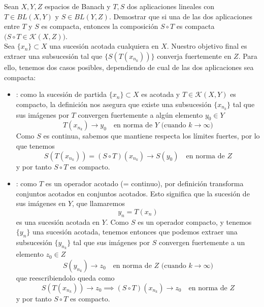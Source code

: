 \begin{ejercicio}
    Sean $X, Y, Z$ espacios de Banach y $T, S$ dos aplicaciones lineales con $T \in BL(X,Y)$ y $S \in BL(Y,Z)$. Demostrar que si una de las dos aplicaciones entre $T$ y $S$ es compacta, entonces la composición $S \circ T$ es compacta $\big( S \circ T \in \mathcal{K}(X,Z) \big)$. \\

    \noindent
    Sea $\{x_n\} \subset X$ una sucesión acotada cualquiera en $X$. Nuestro objetivo final es extraer una subsucesión tal que $\{S(T(x_{n_{k}}))\}$ converja fuertemente en $Z$. Para ello, tenemos dos casos posibles, dependiendo de cual de las dos aplicaciones sea compacta:
    \begin{itemize}
        \item {}: como la sucesión de partida $\{x_n\} \subset X$ es acotada y $T \in \mathcal{K}(X,Y)$ es compacto, la definición nos asegura que existe una subsucesión $\{x_{n_k}\}$ tal que sus imágenes por $T$ convergen fuertemente a algún elemento $y_0 \in Y$
        $$T(x_{n_k}) \longrightarrow y_0 \quad \text{en norma de } Y \text{ (cuando } k \to \infty)$$
        Como $S$ es continua, sabemos que mantiene respecta los límites fuertes, por lo que tenemos
        $$S(T(x_{n_k}))=(S\circ T)(x_{n_k}) \longrightarrow S(y_0) \quad \text{en norma de } Z$$
        y por tanto $S \circ T$ es compacto.

        \item {}: como $T$ es un operador acotado (= continuo), por definición transforma conjuntos acotados en conjuntos acotados. Esto significa que la sucesión de sus imágenes en $Y$, que llamaremos 
        $$y_n = T(x_n)$$ 
        es una sucesión acotada en $Y$. Como $S$ es un operador compacto, y tenemos $\{y_n\}$ una sucesión acotada, tenemos entonces que podemos extraer una subsucesión $\{y_{n_k}\}$ tal que sus imágenes por $S$ convergen fuertemente a un elemento $z_0 \in Z$
        $$S(y_{n_k}) \longrightarrow z_0 \quad \text{en norma de } Z \text{ (cuando } k \to \infty)$$
        que reescribiendolo queda como
        $$S(T(x_{n_k})) \longrightarrow z_0 \implies (S \circ T)(x_{n_k}) \longrightarrow z_0 \quad \text{en norma de } Z$$
        y por tanto $S\circ T$ es compacto.
    \end{itemize}
\end{ejercicio}

